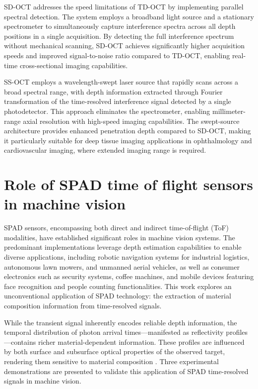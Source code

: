 \documentclass[12pt,a4paper,oneside]{report}
\let\oldsection\section
\renewcommand{\section}{\clearpage\oldsection}
\begin{document}
SD-OCT addresses the speed limitations of TD-OCT by implementing parallel spectral detection. The system employs a broadband light source and a stationary spectrometer to simultaneously capture interference spectra across all depth positions in a single acquisition. By detecting the full interference spectrum without mechanical scanning, SD-OCT achieves significantly higher acquisition speeds and improved signal-to-noise ratio compared to TD-OCT, enabling real-time cross-sectional imaging capabilities.

SS-OCT employs a wavelength-swept laser source that rapidly scans across a broad spectral range, with depth information extracted through Fourier transformation of the time-resolved interference signal detected by a single photodetector. This approach eliminates the spectrometer, enabling millimeter-range axial resolution with high-speed imaging capabilities. The swept-source architecture provides enhanced penetration depth compared to SD-OCT, making it particularly suitable for deep tissue imaging applications in ophthalmology and cardiovascular imaging, where extended imaging range is required.

\newpage
\section{Role of SPAD time of flight sensors in machine vision}
\label{sec:spad_tof_machine_vision}

SPAD sensors, encompassing both direct and indirect time-of-flight (ToF) modalities, have established significant roles in machine vision systems. The predominant implementations leverage depth estimation capabilities to enable diverse applications, including robotic navigation systems for industrial logistics, autonomous lawn mowers, and unmanned aerial vehicles, as well as consumer electronics such as security systems, coffee machines, and mobile devices featuring face recognition and people counting functionalities. This work explores an unconventional application of SPAD technology: the extraction of material composition information from time-resolved signals.

While the transient signal inherently encodes reliable depth information, the temporal distribution of photon arrival times—manifested as reflectivity profiles—contains richer material-dependent information. These profiles are influenced by both surface and subsurface optical properties of the observed target, rendering them sensitive to material composition \cite{su2016}. Three experimental demonstrations are presented to validate this application of SPAD time-resolved signals in machine vision.
\end{document}
